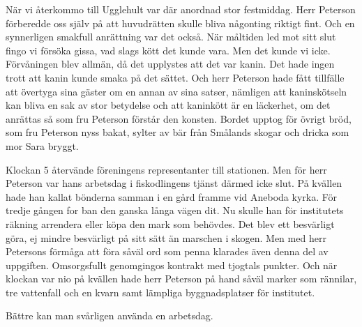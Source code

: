 När vi återkommo till Ugglehult var där anordnad stor
festmiddag. Herr Peterson förberedde oss själv på att huvudrätten
skulle bliva någonting riktigt fint. Och en synnerligen smakfull
anrättning var det också. När måltiden led mot sitt slut fingo
vi försöka gissa, vad slags kött det kunde vara. Men det kunde
vi icke. Förvåningen blev allmän, då det upplystes att det var
kanin. Det hade ingen trott att kanin kunde smaka på det
sättet. Och herr Peterson hade fått tillfälle att övertyga sina
gäster om en annan av sina satser, nämligen att kaninskötseln
kan bliva en sak av stor betydelse och att kaninkött är en
läckerhet, om det anrättas så som fru Peterson förstår den konsten.
Bordet upptog för övrigt bröd, som fru Peterson nyss bakat,
sylter av bär från Smålands skogar och dricka som mor Sara bryggt.

Klockan 5 återvände föreningens representanter till stationen.
Men för herr Peterson var hans arbetsdag i fiskodlingens tjänst
därmed icke slut. På kvällen hade han kallat bönderna samman
i en gård framme vid Aneboda kyrka. För tredje gången for
ban den ganska långa vägen dit. Nu skulle han för institutets
räkning arrendera eller köpa den mark som behövdes. Det blev
ett besvärligt göra, ej mindre besvärligt på sitt sätt än marschen
i skogen. Men med herr Petersons förmåga att föra såväl ord
som penna klarades även denna del av uppgiften. Omsorgsfullt
genomgingos kontrakt med tjogtals punkter. Och när klockan var
nio på kvällen hade herr Peterson på hand såväl marker som rännilar, tre vattenfall och en kvarn samt lämpliga
byggnadsplatser för institutet.

Bättre kan man svårligen använda en arbetsdag.
